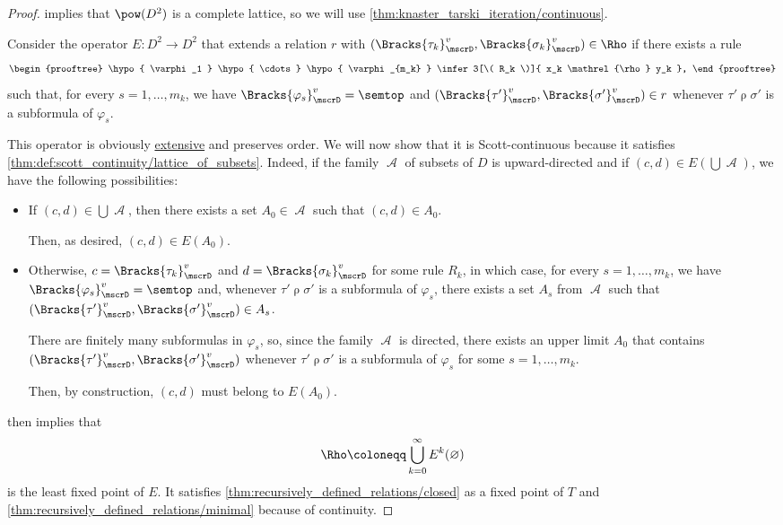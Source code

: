 \begin{proof}
   implies that \( \pow(D^2) \) is a complete lattice, so we will use \cref{thm:knaster_tarski_iteration/continuous}.

  Consider the operator \( E: D^2 \to D^2 \) that extends a relation \( r \) with \( (\Bracks{\tau_k}_\mscrD^v, \Bracks{\sigma_k}_\mscrD^v) \in \Rho \) if there exists a rule
  \begin{equation*}
    \begin{prooftree}
      \hypo{ \varphi_1 }
      \hypo{ \cdots }
      \hypo{ \varphi_{m_k} }
      \infer3[\( R_k \)]{ x_k \mathrel{\rho} y_k },
    \end{prooftree}
  \end{equation*}
  such that, for every \( s = 1, \ldots, m_k \), we have \( \Bracks{\varphi_s}_\mscrD^v = \semtop \) and \( (\Bracks{\tau'}_\mscrD^v, \Bracks{\sigma'}_\mscrD^v) \in r \) whenever \( \tau' \mathrel{\rho} \sigma' \) is a subformula of \( \varphi_s \).

  This operator is obviously \hyperref[def:extensive_function]{extensive} and preserves order. We will now show that it is Scott-continuous because it satisfies \cref{thm:def:scott_continuity/lattice_of_subsets}. Indeed, if the family \( \mscrA \) of subsets of \( D \) is upward-directed and if \( (c, d) \in E(\bigcup \mscrA) \), we have the following possibilities:
  \begin{itemize}
    \item If \( (c, d) \in \bigcup \mscrA \), then there exists a set \( A_0 \in \mscrA \) such that \( (c, d) \in A_0 \).

    Then, as desired, \( (c, d) \in E(A_0) \).

    \item Otherwise, \( c = \Bracks{\tau_k}_\mscrD^v \) and \( d = \Bracks{\sigma_k}_\mscrD^v \) for some rule \( R_k \), in which case, for every \( s = 1, \ldots, m_k \), we have \( \Bracks{\varphi_s}_\mscrD^v = \semtop \) and, whenever \( \tau' \mathrel{\rho} \sigma' \) is a subformula of \( \varphi_s \), there exists a set \( A_s \) from \( \mscrA \) such that \( (\Bracks{\tau'}_\mscrD^v, \Bracks{\sigma'}_\mscrD^v) \in A_s \).

    There are finitely many subformulas in \( \varphi_s \), so, since the family \( \mscrA \) is directed, there exists an upper limit \( A_0 \) that contains \( (\Bracks{\tau'}_\mscrD^v, \Bracks{\sigma'}_\mscrD^v) \) whenever \( \tau' \mathrel{\rho} \sigma' \) is a subformula of \( \varphi_s \) for some \( s = 1, \ldots, m_k \).

    Then, by construction, \( (c, d) \) must belong to \( E(A_0) \).
  \end{itemize}

   then implies that
  \begin{equation*}
    \Rho \coloneqq \bigcup_{k=0}^\infty E^k(\varnothing)
  \end{equation*}
  is the least fixed point of \( E \). It satisfies \cref{thm:recursively_defined_relations/closed} as a fixed point of \( T \) and \cref{thm:recursively_defined_relations/minimal} because of continuity.
\end{proof}

